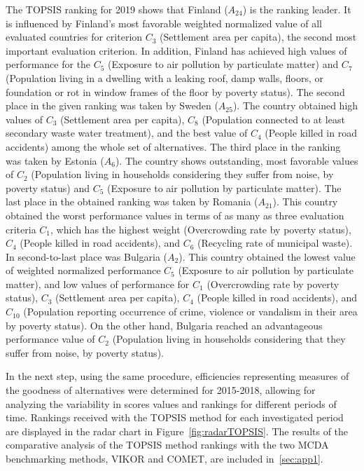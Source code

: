 \documentclass[final,5p,times,twocolumn,authoryear]{elsarticle}
\begin{document}
The TOPSIS ranking for 2019 shows that Finland ($A_{24}$) is the ranking leader. It is influenced by Finland's most favorable weighted normalized value of all evaluated countries for criterion $C_{3}$ (Settlement area per capita), the second most important evaluation criterion. In addition, Finland has achieved high values of performance for the $C_{5}$ (Exposure to air pollution by particulate matter) and $C_{7}$ (Population living in a dwelling with a leaking roof, damp walls, floors, or foundation or rot in window frames of the floor by poverty status). The second place in the given ranking was taken by Sweden ($A_{25}$). The country obtained high values of $C_{3}$ (Settlement area per capita), $C_{8}$ (Population connected to at least secondary waste water treatment), and the best value of $C_{4}$ (People killed in road accidents) among the whole set of alternatives. The third place in the ranking was taken by Estonia ($A_{6}$). The country shows outstanding, most favorable values of $C_{2}$ (Population living in households considering they suffer from noise, by poverty status) and $C_{5}$ (Exposure to air pollution by particulate matter). The last place in the obtained ranking was taken by Romania ($A_{21}$). This country obtained the worst performance values in terms of as many as three evaluation criteria $C_{1}$, which has the highest weight (Overcrowding rate by poverty status), $C_{4}$ (People killed in road accidents), and $C_{6}$ (Recycling rate of municipal waste). In second-to-last place was Bulgaria ($A_{2}$). This country obtained the lowest value of weighted normalized performance $C_{5}$ (Exposure to air pollution by particulate matter), and low values of performance for $C_{1}$ (Overcrowding rate by poverty status), $C_{3}$ (Settlement area per capita), $C_{4}$ (People killed in road accidents), and $C_{10}$ (Population reporting occurrence of crime, violence or vandalism in their area by poverty status). On the other hand, Bulgaria reached an advantageous performance value of $C_{2}$ (Population living in households considering that they suffer from noise, by poverty status).

In the next step, using the same procedure, efficiencies representing measures of the goodness of alternatives were determined for 2015-2018, allowing for analyzing the variability in scores values and rankings for different periods of time. Rankings received with the TOPSIS method for each investigated period are displayed in the radar chart in Figure~\ref{fig:radarTOPSIS}. The results of the comparative analysis of the TOPSIS method rankings with the two MCDA benchmarking methods, VIKOR and COMET, are included in~\ref{sec:app1}.
\end{document}
